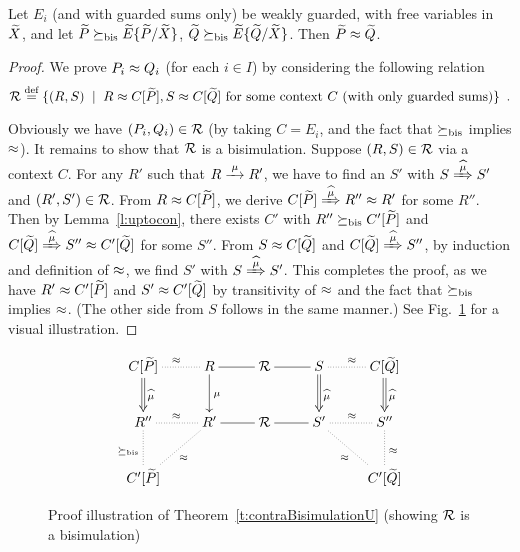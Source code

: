 \begin{theorem}
\label{t:contraBisimulationU} %
Let $E_i$ (and with guarded sums only) be weakly guarded,   with free
variables in $\widetilde X$, and let $\widetilde P \mathrel{\succeq_{\rm{bis}}} \widetilde E\{\widetilde P/\widetilde X\}$,
    $\widetilde Q \mathrel{\succeq_{\rm{bis}}} \widetilde E\{\widetilde Q/\widetilde X\}$. Then $\widetilde P \approx \widetilde Q$.
\end{theorem}

\begin{proof}
We  prove $P_i \approx Q_i$ (for each $i \in I$) by considering the following relation
\begin{equation*}
{\cal R} \stackrel{\mbox{\scriptsize def}}{=} \{(R,S) \; \mid \; R \approx C [\widetilde P], S \approx C [\widetilde Q] \mbox{~for some context
$C$ (with only guarded sums)} \} \enspace.
\end{equation*}

Obviously we have $(P_i,Q_i) \in {\cal R}$ (by taking $C = E_i$, and
the fact that $\mathrel{\succeq_{\rm{bis}}}$ implies $\approx$). It remains to
show that ${\cal R}$ is a bisimulation. Suppose $(R, S) \in {\cal R}$ via a context
$C$. For any $R'$ such that $R \arr{\mu} R'$, we have to find an $S'$ with $S \Arcap{\mu}
S'$ and $(R', S') \in {\cal R}$. From $R \approx C[{\widetilde P}]$, we derive $C[{\til P}]
\Arcap{\mu} R'' \wb R'$ for some $R''$. Then by Lemma~\ref{l:uptocon},
there exists $C'$ with $R'' \mathrel{\succeq_{\rm{bis}}} C'[{\widetilde P}]$ and $C[{\til Q}]
\Arcap{\mu} S'' \wb C'[{\til Q}]$ for some $S''$. From $S \approx C[{\widetilde
  Q}]$ and $C[{\til Q}] \Arcap{\mu} S''$, by induction and definition of $\approx$, we find
 $S'$ with $S \Arcap{\mu} S'$. This completes the
proof, as we have $R' \approx C'[{\widetilde P}]$ and $S' \approx C'[{\widetilde Q}]$ by
transitivity of $\approx$ and the fact that $\mathrel{\succeq_{\rm{bis}}}$ implies $\approx$.
(The other side from $S$ follows in the same manner.)
See Fig.~\ref{fig:310} for a visual illustration.
\end{proof}

\begin{figure}[ht]
\begin{displaymath}
  \xymatrix{
    {C[{\til P}]} \ar@{.}[r]^{\wb} \ar@{=>}[d]^{\widehat{\mu}} & {R} \ar@{-}[r]
    \ar@{->}[d]^{\mu} & {\R} \ar@{-}[r] & {S} \ar@{.}[r]^{\wb}
    \ar@{=>}[d]^{\widehat{\mu}} & {C[{\til Q}]} \ar@{=>}[d]^{\widehat{\mu}} \\
    {R''} \ar@{.}[d]_{\mcontrBIS} \ar@{.}[r]^{\wb} & {R'} \ar@{-}[r]
    \ar@{.}[ld]^{\wb} & {\R} \ar@{-}[r] & {S'} \ar@{.}[r]^{\wb} \ar@{.}[rd]_{\wb}
    & {S''} \ar@{.}[d]^{\wb} \\
    {C'[{\til P}]} & {} & {} & {} & {C'[{\til Q}]}
  }
\end{displaymath}
\caption{Proof illustration of Theorem~\ref{t:contraBisimulationU}
  (showing ${\cal R}$ is a bisimulation)}
\label{fig:310}
\end{figure}


